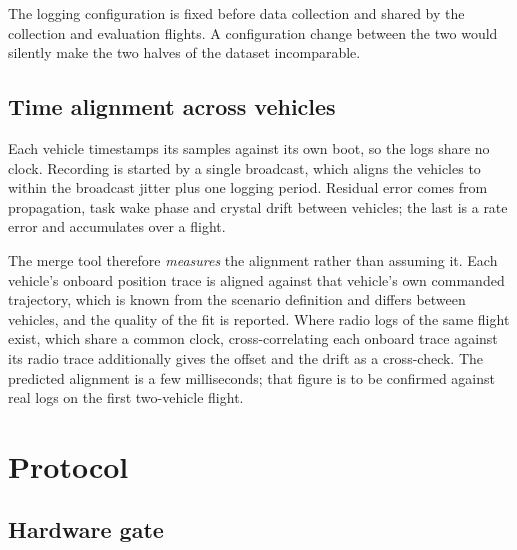 The logging configuration is fixed before data collection and shared by the collection and
evaluation flights. A configuration change between the two would silently make the two halves of
the dataset incomparable.

\subsection{Time alignment across vehicles}

Each vehicle timestamps its samples against its own boot, so the logs share no clock. Recording is
started by a single broadcast, which aligns the vehicles to within the broadcast jitter plus one
logging period. Residual error comes from propagation, task wake phase and crystal drift between
vehicles; the last is a rate error and accumulates over a flight.

The merge tool therefore \emph{measures} the alignment rather than assuming it. Each vehicle's
onboard position trace is aligned against that vehicle's own commanded trajectory, which is known
from the scenario definition and differs between vehicles, and the quality of the fit is reported.
Where radio logs of the same flight exist, which share a common clock, cross-correlating each
onboard trace against its radio trace additionally gives the offset and the drift as a
cross-check. The predicted alignment is a few milliseconds; that figure is to be confirmed
against real logs on the first two-vehicle flight.

\section{Protocol}
\label{sec:setup-protocol}

\subsection{Hardware gate}
\label{sec:setup-gate}

